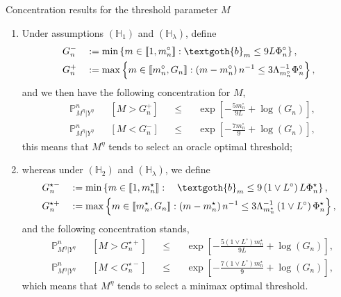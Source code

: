 \documentclass[final,hyperref={pdfpagelabels=false}]{beamer}
\begin{document}
\begin{frame}[t]
\begin{columns}[t]
\begin{column}{.30\textwidth}
\begin{block}{\rule{0pt}{2.5ex} Concentration results for the threshold parameter $M$}
\begin{enumerate}
\item Under assumptions $\left(\mathbb{H}_{1}\right)$ and $\left(\mathbb{H}_{\lambda}\right)$, define
\begin{alignat*}{2}
&G_{n}^{-} &&:= \min\left\{m \in \llbracket 1, m_{n}^{\circ} \rrbracket : \textgoth{b}_{m} \leq 9 L \Phi_{n}^{\circ}\right\},\\
&G_{n}^{+} &&:= \max \left\{m \in \llbracket m_{n}^{\circ}, G_{n} \rrbracket : \left( m - m_{n}^{\circ} \right) n^{-1} \leq 3 \Lambda_{m_{n}^{\circ}}^{-1} \Phi_{n}^{\circ}\right\},
\end{alignat*}
and we then have the following concentration for $M$,
\begin{alignat*}{4}
&\mathbb{P}_{M^{\eta} \vert Y^{\eta}}^{n}&&\left[M > G_{n}^{+}\right] &&\leq&& \exp\left[- \frac{5 m_{n}^{\circ}}{9 L} + \log \left(G_{n}\right)\right],\\
&\mathbb{P}_{M^{\eta} \vert Y^{\eta}}^{n}&&\left[M < G_{n}^{-}\right] &&\leq&& \exp\left[- \frac{7 m_{n}^{\circ}}{9} + \log \left(G_{n}\right)\right],
\end{alignat*}
\textcolor{red!90!black}{this means that $M^{\eta}$ tends to select an oracle optimal threshold};
\item whereas under $\left(\mathbb{H}_{2}\right)$ and $\left(\mathbb{H}_{\lambda}\right)$, we define
\begin{alignat*}{2}
&G_{n}^{\star-} &&:= \min\left\{m \in \llbracket 1, m_{n}^{\star} \rrbracket : \quad \textgoth{b}_{m} \leq 9 \left(1 \vee L^{\circ}\right) L \Phi_{n}^{\star}\right\},\\
&G_{n}^{\star+} &&:= \max \left\{m \in \llbracket m_{n}^{\star}, G_{n} \rrbracket : \left( m - m_{n}^{\star} \right) n^{-1} \leq 3 \Lambda_{m_{n}^{\star}}^{-1} \left(1 \vee L^{\circ}\right) \Phi_{n}^{\star}\right\},
\end{alignat*}
and the following concentration stands,
\begin{alignat*}{4}
&\mathbb{P}_{M^{\eta} \vert Y^{\eta}}^{n}&&\left[M > G_{n}^{\star+}\right] &&\leq &&\exp\left[- \frac{5 \left(1 \vee L^{\circ}\right) m_{n}^{\star}}{9 L} + \log \left(G_{n}\right)\right],\\
&\mathbb{P}_{M^{\eta} \vert Y^{\eta}}^{n}&&\left[M < G_{n}^{\star-}\right] &&\leq &&\exp\left[- \frac{7 \left(1 \vee L^{\circ}\right) m_{n}^{\star}}{9} + \log \left(G_{n}\right)\right],
\end{alignat*}
\textcolor{red!90!black}{which means that $M^{\eta}$ tends to select a minimax optimal threshold}.
\end{enumerate}
\end{block}



\end{column}
\end{columns}
\end{frame}
\end{document}
